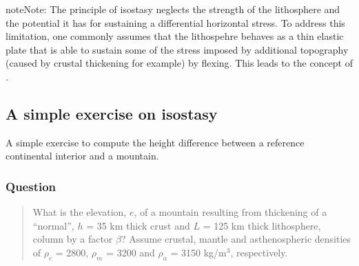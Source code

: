 \documentclass[letterpaper,10pt,english]{jupyterBook}
\begin{document}
\begin{sphinxadmonition}{note}{Note:}
\sphinxAtStartPar
The principle of isostasy neglects the strength of the lithosphere and the potential it has for sustaining a differential horizontal stress. To address this limitation, one commonly assumes that the lithospehre behaves as a thin elastic plate that is able to sustain some of the stress imposed by additional topography (caused by crustal thickening for example) by flexing. This leads to the concept of {\hyperref[\detokenize{glossary:term-Flexural-isostasy}]{}}.
\end{sphinxadmonition}

\sphinxstepscope


\subsection{A simple exercise on isostasy}
\label{\detokenize{exercise-isostasy:a-simple-exercise-on-isostasy}}\label{\detokenize{exercise-isostasy::doc}}
\sphinxAtStartPar
A simple exercise to compute the height difference between a reference continental interior and a mountain.


\subsubsection{Question}
\label{\detokenize{exercise-isostasy:question}}\begin{quote}

\sphinxAtStartPar
What is the elevation, \(e\), of a mountain resulting from thickening of a “normal”, \(h\) = 35 km thick crust and \(L\) = 125 km thick lithosphere, column by a factor \(\beta\)? Assume crustal, mantle and asthenospheric densities of \(\rho_c\) = 2800, \(\rho_m\) = 3200 and \(\rho_a\) = 3150 kg/m\(^3\), respectively.
\end{quote}
\end{document}
